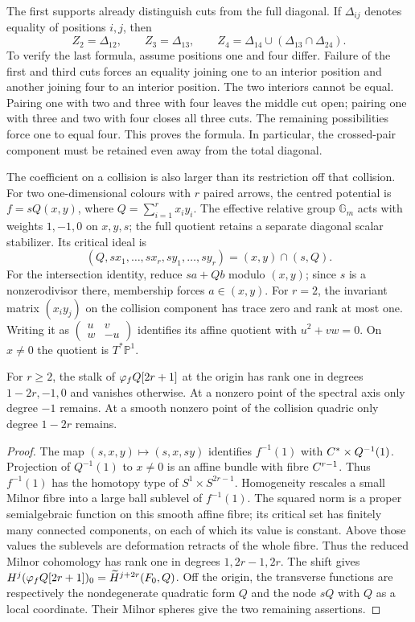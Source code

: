 The first supports already distinguish cuts from the full
diagonal. If $\Delta_{ij}$ denotes equality of positions $i,j$,
then
\[
 Z_2=\Delta_{12},\qquad Z_3=\Delta_{13},\qquad
 Z_4=\Delta_{14}\cup(\Delta_{13}\cap\Delta_{24}).
\]
To verify the last formula, assume positions one and four differ.
Failure of the first and third cuts forces an equality joining
one to an interior position and another joining four to an
interior position. The two interiors cannot be equal. Pairing
one with two and three with four leaves the middle cut open;
pairing one with three and two with four closes all three cuts.
The remaining possibilities force one to equal four. This proves
the formula. In particular, the crossed-pair component must be
retained even away from the total diagonal.

The coefficient on a collision is also larger than its restriction
off that collision. For two one-dimensional colours with $r$
paired arrows, the centred potential is
$f=sQ(x,y)$, where $Q=\sum_{i=1}^r x_i y_i$.
The effective relative group $\mathbb G_m$ acts with weights
$1,-1,0$ on $x,y,s$; the full quotient retains a separate
diagonal scalar stabilizer. Its critical ideal is
\[
 (Q,sx_1,\ldots,sx_r,sy_1,\ldots,sy_r)
       =(x,y)\cap(s,Q).
\]
For the intersection identity, reduce $sa+Qb$ modulo $(x,y)$;
since $s$ is a nonzerodivisor there, membership forces
$a\in(x,y)$. For $r=2$, the invariant matrix $(x_i y_j)$ on
the collision component has trace zero and rank at most one.
Writing it as $\left(\begin{smallmatrix}u&v\\w&-u\end{smallmatrix}\right)$
identifies its affine quotient with $u^2+vw=0$.
On $x\ne0$ the quotient is $T^*\mathbb P^1$.

\begin{proposition}
\label{hall:prop:collision-stalk}
For $r\geq2$, the stalk of $\varphi_fQ[2r+1]$ at the origin
has rank one in degrees $1-2r,-1,0$ and vanishes otherwise.
At a nonzero point of the spectral axis only degree $-1$
remains. At a smooth nonzero point of the collision quadric
only degree $1-2r$ remains.
\end{proposition}

\begin{proof}
The map $(s,x,y)\mapsto(s,x,sy)$ identifies $f^{-1}(1)$ with
$C^*\times Q^{-1}(1)$. Projection of $Q^{-1}(1)$ to $x\ne0$
is an affine bundle with fibre $C^{r-1}$. Thus $f^{-1}(1)$
has the homotopy type of $S^1\times S^{2r-1}$.
Homogeneity rescales a small Milnor fibre into a large ball
sublevel of $f^{-1}(1)$. The squared norm is a proper
semialgebraic function on this smooth affine fibre; its critical
set has finitely many connected components, on each of which
its value is constant. Above those values the sublevels are
deformation retracts of the whole fibre. Thus the reduced
Milnor cohomology has rank one in degrees $1,2r-1,2r$.
The shift gives
$H^j(\varphi_fQ[2r+1])_0=\widetilde H^{j+2r}(F_0,Q)$.
Off the origin, the transverse functions are respectively the
nondegenerate quadratic form $Q$ and the node $sQ$ with $Q$
as a local coordinate. Their Milnor spheres give the two
remaining assertions.
\end{proof}

